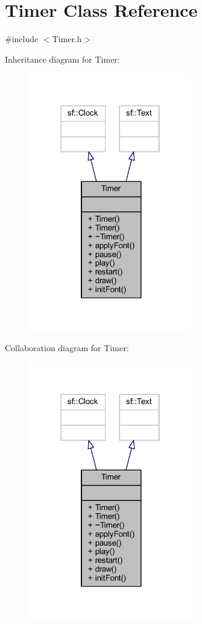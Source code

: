 \hypertarget{class_timer}{}\section{Timer Class Reference}
\label{class_timer}


{\ttfamily \#include $<$Timer.\+h$>$}



Inheritance diagram for Timer\+:
\nopagebreak
\begin{figure}[H]
\begin{center}
\leavevmode
\includegraphics[width=202pt]{class_timer__inherit__graph}
\end{center}
\end{figure}


Collaboration diagram for Timer\+:
\nopagebreak
\begin{figure}[H]
\begin{center}
\leavevmode
\includegraphics[width=202pt]{class_timer__coll__graph}
\end{center}
\end{figure}
